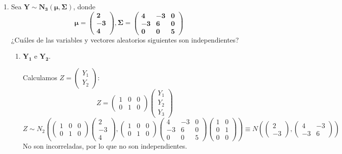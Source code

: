 \documentclass[11pt,a4paper]{article}
\begin{document}
\begin{enumerate}[label=\arabic*.]
\newpage
\bfseries
\item  Sea $\mathbf{Y \sim N_{3}(\mu, \Sigma)}$, donde
$$\mathbf{\mu = \begin{pmatrix} \mathbf{2} \\ \mathbf{-3} \\ \mathbf{4} \end{pmatrix}, \Sigma = \begin{pmatrix}
\mathbf{4} & \mathbf{-3} & \mathbf{0} \\
\mathbf{-3} & \mathbf{6} & \mathbf{0} \\
\mathbf{0} & \mathbf{0} & \mathbf{5}
\end{pmatrix}}$$
¿Cuáles de las variables y vectores aleatorios siguientes son independientes?
\begin{enumerate}[label=\alph*)]
\item $\mathbf{Y_{1}}$ e $\mathbf{Y_{2}}$.
\vspace{0.5cm}
\normalfont

Calculamos $Z = \begin{pmatrix} Y_{1} \\ Y_{2} \end{pmatrix}$:
$$Z = \begin{pmatrix}
1 & 0 & 0 \\
0 & 1 & 0
\end{pmatrix} \begin{pmatrix} Y_{1} \\ Y_{2} \\ Y_{3} \end{pmatrix}$$
$$Z \sim N_{2}(\begin{pmatrix}
1 & 0 & 0 \\
0 & 1 & 0
\end{pmatrix} \begin{pmatrix} 2 \\ -3 \\ 4 \end{pmatrix}, \begin{pmatrix}
1 & 0 & 0 \\
0 & 1 & 0
\end{pmatrix} \begin{pmatrix}
4 & -3 & 0 \\
-3 & 6 & 0 \\
0 & 0 & 5
\end{pmatrix} \begin{pmatrix}
1 & 0 \\
0 & 1 \\
0 & 0
\end{pmatrix}) \equiv N(\begin{pmatrix} 2 \\ -3 \end{pmatrix}, \begin{pmatrix}
4 & -3 \\
-3 & 6
\end{pmatrix})$$
No son incorreladas, por lo que no son independientes.


\end{enumerate}
\end{enumerate}
\end{document}
